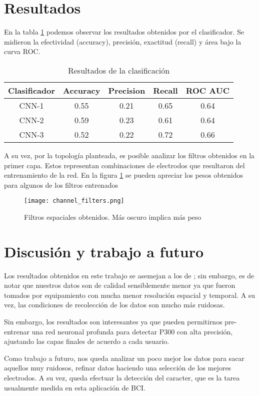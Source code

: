 \section{Resultados}

En la tabla \ref{tab:scores} podemos observar los resultados obtenidos por el clasificador. Se midieron la efectividad (accuracy), precisión, exactitud (recall) y área bajo la curva ROC. 

\begin{table}[t]
    \centering
    \begin{tabular}{|c|c|c|c|c|}
        \hline
        Clasificador & Accuracy & Precision & Recall & ROC AUC  \\\hline
        CNN-1 & 0.55 & 0.21 & 0.65 & 0.64 \\
        CNN-2 & 0.59 & 0.23 & 0.61 & 0.64 \\
        CNN-3 & 0.52 & 0.22 & 0.72 & 0.66 \\
        \hline 
    \end{tabular}
    \caption{Resultados de la clasificación}
    \label{tab:scores}
\end{table}

A su vez, por la topología planteada, es posible analizar los filtros obtenidos en la primer capa. Estos representan combinaciones de electrodos que resultaron del entrenamiento de la red. En la figura \ref{fig:kernels} se pueden apreciar los pesos obtenidos para algunos de los filtros entrenados


\begin{figure}
    \centering
    \texttt{[image: channel\_filters.png]}
    \caption{Filtros espaciales obtenidos. Más oscuro implica más peso}
    \label{fig:kernels}
\end{figure}


\section{Discusión y trabajo a futuro}

Los resultados obtenidos en este trabajo se asemejan a los de \cite{cecotti2011}; sin embargo, es de notar que nuestros datos son de calidad sensiblemente menor ya que fueron tomados por equipamiento con mucha menor resolución espacial y temporal. A su vez, las condiciones de recolección de los datos son mucho más ruidosas.

Sin embargo, los resultados son interesantes ya que pueden permitirnos pre-entrenar una red neuronal profunda para detectar P300 con alta precisión, ajustando las capas finales de acuerdo a cada usuario.

Como trabajo a futuro, nos queda analizar un poco mejor los datos para sacar aquellos muy ruidosos, refinar datos haciendo una selección de los mejores electrodos. A su vez, queda efectuar la detección del caracter, que es la tarea usualmente medida en esta aplicación de BCI.